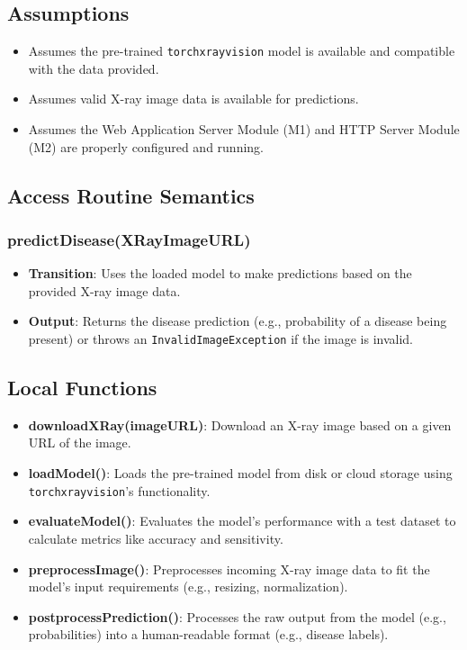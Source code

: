 \documentclass[12pt, titlepage]{article}
\begin{document}
\subsection{Assumptions}
\begin{itemize}
    \item Assumes the pre-trained \texttt{torchxrayvision} model is available and compatible with the data provided.
    \item Assumes valid X-ray image data is available for predictions.
    \item Assumes the Web Application Server Module (M1) and HTTP Server Module (M2) are properly configured and running.
\end{itemize}

\subsection{Access Routine Semantics}
\subsubsection{predictDisease(XRayImageURL)}
\begin{itemize}
    \item \textbf{Transition}: Uses the loaded model to make predictions based on the provided X-ray image data.
    \item \textbf{Output}: Returns the disease prediction (e.g., probability of a disease being present) or throws an \texttt{InvalidImageException} if the image is invalid.
\end{itemize}

\subsection{Local Functions}
\begin{itemize}
    \item \textbf{downloadXRay(imageURL)}: Download an X-ray image based on a given URL of the image.
    \item \textbf{loadModel()}: Loads the pre-trained model from disk or cloud storage using \texttt{torchxrayvision}'s functionality.
    \item \textbf{evaluateModel()}: Evaluates the model’s performance with a test dataset to calculate metrics like accuracy and sensitivity.
    \item \textbf{preprocessImage()}: Preprocesses incoming X-ray image data to fit the model's input requirements (e.g., resizing, normalization).
    \item \textbf{postprocessPrediction()}: Processes the raw output from the model (e.g., probabilities) into a human-readable format (e.g., disease labels).
\end{itemize}
\end{document}
